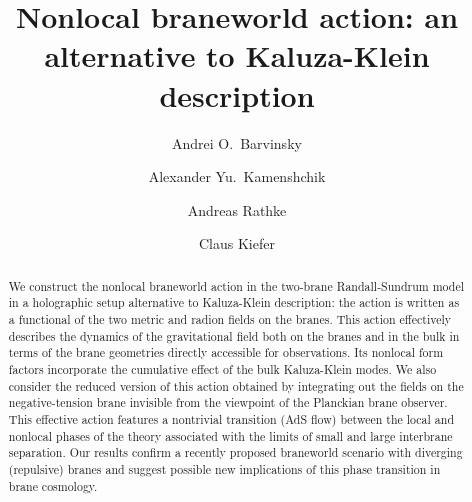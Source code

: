 \documentclass[a4paper,preprint,nofootinbib,
                 showpacs,preprintnumbers,amsmath,amssymb]{revtex4}
\begin{document}
     
\title{\bf Nonlocal braneworld action: an alternative to Kaluza-Klein 
description} 
\author{Andrei O.\ Barvinsky} 
\author{Alexander Yu.\ Kamenshchik} 
\author{Andreas Rathke} 
\author{Claus Kiefer} 
\begin{abstract} 
We construct the nonlocal braneworld action in the  
two-brane Randall-Sundrum model in a holographic setup alternative to  
Kaluza-Klein description: the action is written as a functional  
of the two metric and radion fields on the branes. This action  
effectively describes the dynamics of the gravitational 
field both on the branes and in the bulk in terms of the brane geometries 
directly accessible for observations. Its nonlocal form factors  
incorporate the cumulative effect of the bulk Kaluza-Klein modes.  
We also consider the reduced version of this action obtained by  
integrating out the fields on the negative-tension brane invisible 
from the viewpoint of the Planckian brane 
observer. This effective action features a nontrivial transition  
(AdS flow) between the local and nonlocal phases of the theory  
associated with the limits of small and large interbrane separation.  
Our results confirm a recently proposed braneworld scenario 
with diverging (repulsive) branes and suggest possible new  
implications of this phase transition in brane cosmology. 
 
 
 
\end{abstract} 
 
\maketitle 
\end{document}
